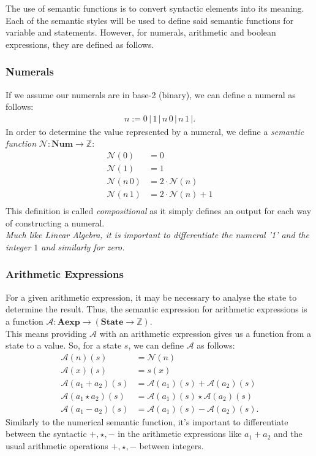 \documentclass[a4paper, 12pt, twoside]{article}
\begin{document}
The use of semantic functions is to convert syntactic elements into its meaning.
Each of the semantic styles will be used to define said semantic functions
for variable and statements. However, for numerals, arithmetic and boolean
expressions, they are defined as follows. 

\subsubsection{Numerals}

If we assume our numerals are in base-2 (binary), we can define a numeral
as follows: \begin{gather*}
  n := 0 \, | \, 1 \, | \, n \, 0 \, | \, n \, 1 \, |.
\end{gather*} In order to determine the value represented by a numeral, we
define a \textit{semantic function} $\mathcal{N} : \textbf{Num} \to \mathbb{Z}$:
\begin{align*}
  \mathcal{N}(0) &= 0 \\
  \mathcal{N}(1) &= 1 \\
  \mathcal{N}(n \, 0) &= 2 \cdot \mathcal{N}(n) \\
  \mathcal{N}(n \, 1) &= 2 \cdot \mathcal{N}(n) + 1 \\
\end{align*} This definition is called \textit{compositional} as it simply
defines an output for each way of constructing a numeral.
\\[\baselineskip]
\textit{Much like Linear Algebra, it is important to differentiate
the numeral '1' and the integer $1$ and similarly for zero.}

\subsubsection{Arithmetic Expressions}

For a given arithmetic expression, it may be necessary to analyse the state
to determine the result. Thus, the semantic expression for arithmetic
expressions is a function $\mathcal{A} : \textbf{Aexp} \to (\textbf{State} 
\to \mathbb{Z})$. 
\\[\baselineskip]
This means providing $\mathcal{A}$ with an arithmetic
expression gives us a function from a state to a value. So, for a state $s$,
we can define $\mathcal{A}$ as follows: \begin{align*}
  \mathcal{A}(n)(s) &= \mathcal{N}(n) \\
  \mathcal{A}(x)(s) &= s(x) \\
  \mathcal{A}(a_1 + a_2)(s) &= \mathcal{A}(a_1)(s) + \mathcal{A}(a_2)(s) \\
  \mathcal{A}(a_1 \star a_2)(s) &= \mathcal{A}(a_1)(s) \star \mathcal{A}(a_2)(s) \\
  \mathcal{A}(a_1 - a_2)(s) &= \mathcal{A}(a_1)(s) - \mathcal{A}(a_2)(s).
\end{align*} Similarly to the numerical semantic function, it's important
to differentiate between the syntactic $+, \star, -$ in the arithmetic
expressions like $a_1 + a_2$ and the usual arithmetic operations $+, \star, -$
between integers.
\end{document}
